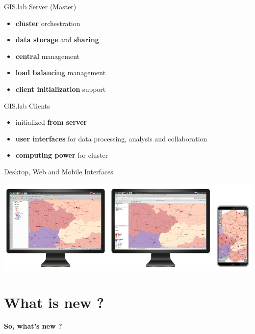 \documentclass[12pt]{beamer}
\begin{document}
\begin{frame}{GIS.lab Server (Master)}
	\begin{itemize}
		\item \textbf{cluster} orchestration
		\item \textbf{data storage} and \textbf{sharing}
		\item \textbf{central} management
		\item \textbf{load balancing} management
		\item \textbf{client initialization} support
	\end{itemize}
\end{frame}

\begin{frame}{GIS.lab Clients}
	\begin{itemize}
		\item initialized \textbf{from server}
		\item \textbf{user interfaces} for data processing, analysis and collaboration
		\item \textbf{computing power} for cluster
	\end{itemize}
\end{frame}

\begin{frame}{Desktop, Web and Mobile Interfaces}
	\begin{center}
		\includegraphics[keepaspectratio=true,height=0.5\textheight]{images/gislab-desktop-web-mobile.png}
	\end{center}
\end{frame}


\section{What is new ?}
\begin{frame}
	\begin{center}
		\LARGE\textbf{So, what's new ?}	
	\end{center}
\end{frame}
\end{document}
